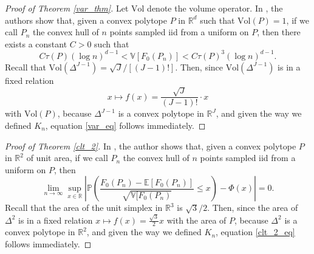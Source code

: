 \documentclass[12pt, reqno]{amsart}
\theoremstyle{definition}
\newtheorem{claim}[theorem]{Claim}
\begin{document}
\begin{proof}[Proof of Theorem \ref{var_thm}]

Let $\text{Vol}$ denote the volume operator. In \cite[Theorem 1.3]{reitzner_var}, the authors show that, given a convex polytope $P$ in $\mathbb{R}^d$ such that $\text{Vol}(P)=1$, if we call $P_n$ the convex hull of $n$ points sampled iid from a uniform on $P$, then there exists a constant $C>0$ such that
$$C \tau(P)(\log n)^{d-1} < \mathbb{V}[F_0(P_n)] < C \tau(P)^3(\log n)^{d-1}.$$
Recall that $\text{Vol}(\Delta^{J-1})=\sqrt{J}/[(J-1)!]$. Then, since $\text{Vol}(\Delta^{J-1})$ is in a fixed relation 
$$x \mapsto f(x)=\frac{\sqrt{J}}{(J-1)!} \cdot x$$ 
with $\text{Vol}(P)$, because $\Delta^{J-1}$ is a convex polytope in $\mathbb{R}^J$, and given the way we defined $K_n$, equation \eqref{var_eq} follows immediately.
\end{proof}




\begin{proof}[Proof of Theorem \ref{clt_2}]
In \cite[Corollary 1.2]{pardon}, the author shows that, given a convex polytope $P$ in $\mathbb{R}^2$ of unit area, if we call $P_n$ the convex hull of $n$ points sampled iid from a uniform on $P$, then
$$\lim_{n\rightarrow\infty} \sup_{x\in\mathbb{R}} \left| \mathbb{P}\left( \frac{F_0(P_n)-\mathbb{E}[F_0(P_n)]}{\sqrt{\mathbb{V}[F_0(P_n)}} \leq x \right) - \Phi(x) \right|=0.$$
Recall that the area of the unit simplex in $\mathbb{R}^3$ is $\sqrt{3}/2$. Then, since the area of $\Delta^2$ is in a fixed relation $x\mapsto f(x)=\frac{\sqrt{3}}{2}x$ with the area of $P$, because $\Delta^2$ is a convex polytope in $\mathbb{R}^2$, and given the way we defined $K_n$, equation \eqref{clt_2_eq} follows immediately.
\end{proof}
\end{document}
